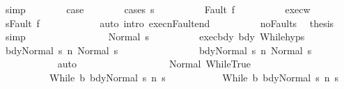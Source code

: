 \begin{isabellebody}
\ simp\isanewline
\ \ \ \ \ \ \isamarkupfalse%
\ {\isacharquery}case\isanewline
\ \ \ \ \ \ \isamarkupfalse%
\ {\isacharparenleft}cases\ s{\isacharprime}{\isacharparenright}\isanewline
\ \ \ \ \ \ \ \ \isamarkupfalse%
\ {\isacharparenleft}Fault\ f{\isacharparenright}\isanewline
\ \ \ \ \ \ \ \ \isamarkupfalse%
\ exec{\isacharunderscore}w\ \isamarkupfalse%
\ {\isachardoublequoteopen}s{\isacharprime}{\isacharprime}{\isacharequal}Fault\ f{\isachardoublequoteclose}\isanewline
\ \ \ \ \ \ \ \ \ \ \isamarkupfalse%
\ {\isacharparenleft}auto\ intro{\isacharcolon}\ execn{\isacharunderscore}Fault{\isacharunderscore}end{\isacharparenright}\isanewline
\ \ \ \ \ \ \ \ \isamarkupfalse%
\ noFault{\isacharunderscore}s{\isacharprime}{\isacharprime}\ \isamarkupfalse%
\ {\isacharquery}thesis\ \isamarkupfalse%
\ simp\isanewline
\ \ \ \ \ \ \isamarkupfalse%
\isanewline
\ \ \ \ \ \ \ \ \isamarkupfalse%
\ {\isacharparenleft}Normal\ s{\isacharprime}{\isacharprime}{\isacharprime}{\isacharparenright}\isanewline
\ \ \ \ \ \ \ \ \isamarkupfalse%
\ exec{\isacharunderscore}bdy\ bdy\ While{\isachardot}hyps\isanewline
\ \ \ \ \ \ \ \ \isamarkupfalse%
\ {\isachardoublequoteopen}{\isasymGamma}{\isasymturnstile}{\isasymlangle}bdy{}{\isacharcomma}Normal\ s{\isasymrangle}\ {\isacharequal}n{\isasymRightarrow}\ Normal\ s{\isacharprime}{\isacharprime}{\isacharprime}{\isachardoublequoteclose}\ \isanewline
\ \ \ \ \ \ \ \ \ \ \ \ \ \ \ {\isachardoublequoteopen}{\isasymGamma}{\isasymturnstile}{\isasymlangle}bdy{}{\isacharcomma}Normal\ s{\isasymrangle}\ {\isacharequal}n{\isasymRightarrow}\ Normal\ s{\isacharprime}{\isacharprime}{\isacharprime}{\isachardoublequoteclose}\isanewline
\ \ \ \ \ \ \ \ \ \ \isamarkupfalse%
\ auto\isanewline
\ \ \ \ \ \ \ \ \isamarkupfalse%
\isanewline
\ \ \ \ \ \ \ \ \isamarkupfalse%
\ Normal\ WhileTrue\isanewline
\ \ \ \ \ \ \ \ \isamarkupfalse%
\ \isanewline
\ \ \ \ \ \ \ \ \ \ {\isachardoublequoteopen}{\isasymGamma}{\isasymturnstile}{\isasymlangle}While\ b\ bdy{}{\isacharcomma}Normal\ s{\isacharprime}{\isacharprime}{\isacharprime}{\isasymrangle}\ {\isacharequal}n{\isasymRightarrow}\ s{\isacharprime}{\isacharprime}{\isachardoublequoteclose}\ \isanewline
\ \ \ \ \ \ \ \ \ \ {\isachardoublequoteopen}{\isasymGamma}{\isasymturnstile}{\isasymlangle}While\ b\ bdy{}{\isacharcomma}Normal\ s{\isacharprime}{\isacharprime}{\isacharprime}{\isasymrangle}\ {\isacharequal}n{\isasymRightarrow}\ s{\isacharprime}{\isacharprime}{\isachardoublequoteclose}\isanewline

\end{isabellebody}
